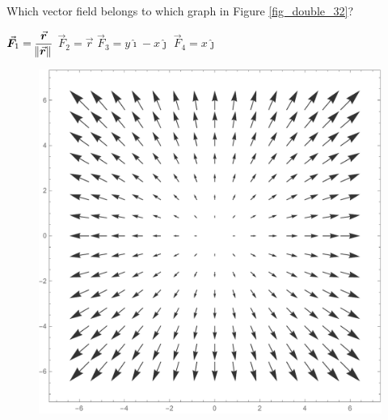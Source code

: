 \subsection*{}
\begin{Exercise}[difficulty = 2, label = Oef_grafiek_vectorvelden] Which vector field belongs to which graph in Figure \ref{fig_double_32}?
    \begin{multicols}{2}
        \Question $\vec F_1 = \dfrac{\vec r}{\norm{\vec r}}$
        \Question $\vec F_2 = \vec r$
        \Question $\vec F_3 = y \hat{\imath} - x \hat{\jmath}$
        \Question $\vec F_4 = x \hat{\jmath}$
        \EndCurrentQuestion
    \end{multicols}
    
\begin{figure}[H]
\includegraphics[scale=0.29]{fig_double_32a} \hspace{1.5cm}

\end{figure}
\end{Exercise}
